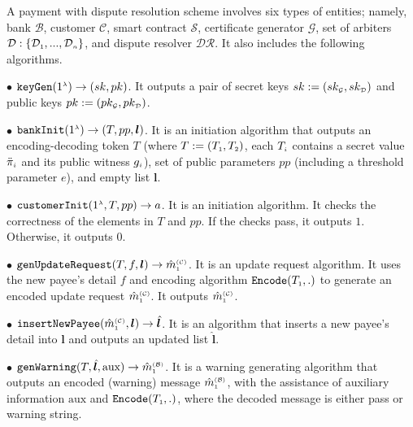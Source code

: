 \begin{definition}\label{def-a::sytax} A payment with dispute resolution  scheme  involves six   types of entities; namely,  bank $\mathcal{B}$, customer $\mathcal{C}$,  smart contract $\mathcal{S}$,  certificate generator $\mathcal{G}$,   set of arbiters $\mathcal{D}:\{\mathcal{D}_{\scriptscriptstyle 1},..., \mathcal{D}_{\scriptscriptstyle n}\}$, and  dispute resolver $\mathcal{DR}$. It also includes the following    algorithms.  

%


\item [$\bullet$]  $\mathtt{keyGen}(1^{\scriptscriptstyle \lambda})\rightarrow (sk,pk)$. It  outputs a pair of secret keys $sk:=(sk_{\scriptscriptstyle\mathcal {G}},sk_{\scriptscriptstyle\mathcal {D}})$ and public keys $pk:=(pk_{\scriptscriptstyle\mathcal {G}},pk_{\scriptscriptstyle\mathcal {D}})$. 
%
\item[$\bullet$] $\mathtt{bankInit}(1^{\scriptscriptstyle \lambda})\rightarrow (T, pp, \bm{l})$. It is an  initiation algorithm that outputs an encoding-decoding token $T$ (where  $T:=(T_{\scriptscriptstyle 1},T_{\scriptscriptstyle 2})$,  each $T_{\scriptscriptstyle i}$  contains  a secret value $\ddot\pi_{\scriptscriptstyle i}$ and its  public witness $g_{\scriptscriptstyle i}$),  set of  public parameters  $pp$  (including a threshold parameter $e$),  and    empty list $\bm{l}$.
%
\item[$\bullet$] $\mathtt{customerInit} (1^{\scriptscriptstyle \lambda}, T, pp)\rightarrow a$. It is an   initiation algorithm. It checks the correctness of the elements in $T$ and $pp$. If the checks pass, it outputs $1$. Otherwise, it outputs $0$. 
%
\item [$\bullet$] $\mathtt{genUpdateRequest}(T, f, {\bm l})\rightarrow \hat m^{\scriptscriptstyle\mathcal{(C)}}_{\scriptscriptstyle 1}$.  It is an update request  algorithm. It uses the new payee's detail $f$ and encoding algorithm $\mathtt{Encode}(T_{\scriptscriptstyle 1},.)$ to generate an encoded update request $\hat  m^{\scriptscriptstyle\mathcal{(C)}}_{\scriptscriptstyle 1}$.  It outputs  $\hat  m^{\scriptscriptstyle\mathcal{(C)}}_{\scriptscriptstyle 1}$.
%
\item [$\bullet$] $\mathtt{insertNewPayee}(\hat{m}^{\scriptscriptstyle\mathcal{(C)}}_{\scriptscriptstyle 1}, {\bm l})\rightarrow  \hat{\bm l}$. It is  an algorithm that inserts a new payee's detail into ${\bm l}$ and outputs an updated list $\hat{\bm l}$.
%
\item  [$\bullet$] $\mathtt{genWarning}(T, \hat{\bm l}, \text{aux})\rightarrow \hat m^{\scriptscriptstyle\mathcal{(B)}}_{\scriptscriptstyle1}$. It is a warning generating algorithm that outputs an encoded (warning) message $\hat m^{\scriptscriptstyle\mathcal{(B)}}_{\scriptscriptstyle1}$, with the assistance of auxiliary information $\text{aux}$ and $\mathtt{Encode}(T_{\scriptscriptstyle 1},.)$, where the decoded message is either pass or warning string. 

\end{definition}
